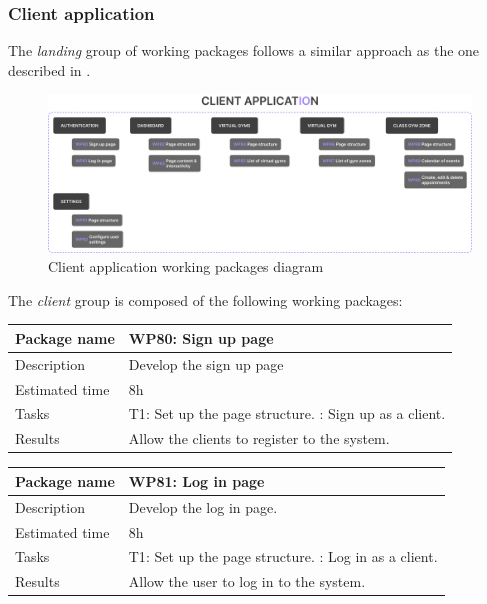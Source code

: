 \documentclass[a4paper, 12pt, oneside]{book}
\begin{document}
\subsubsection{Client application}
The \emph{landing} group of working packages follows a similar approach as the one described in \emph{}.
\begin{figure}[H]
	\centering
	\includegraphics[width=\textwidth]{assets/working-packages/Client.png}
	\caption{Client application working packages diagram}
\end{figure}
The \emph{client} group is composed of the following working packages:
\\[8pt]
\begin{tabularx}{\textwidth}{| l | X |}
	\hline
	\rowcolor{rowColor}
	{\semibf Package name}   & {\semibf WP80}: Sign up page                 \\
	\hline
	{\semibf Description}    & Develop the sign up page                     \\
	\hline
	\rowcolor{rowColor}
	{\semibf Estimated time} & 8h                                           \\
	\hline
	{\semibf Tasks}          & {\semibf T1}: Set up the page structure.
	\newline {\semibf T2}: Sign up as a client.                             \\
	\hline
	\rowcolor{rowColor}
	{\semibf Results}        & Allow the clients to register to the system. \\
	\hline
\end{tabularx}
\vspace*{16pt}
\begin{tabularx}{\textwidth}{| l | X |}
	\hline
	\rowcolor{rowColor}
	{\semibf Package name}   & {\semibf WP81}: Log in page              \\
	\hline
	{\semibf Description}    & Develop the log in page.                 \\
	\hline
	\rowcolor{rowColor}
	{\semibf Estimated time} & 8h                                       \\
	\hline
	{\semibf Tasks}          & {\semibf T1}: Set up the page structure.
	\newline {\semibf T2}: Log in as a client.                          \\
	\hline
	\rowcolor{rowColor}
	{\semibf Results}        & Allow the user to log in to the system.  \\
	\hline
\end{tabularx}
\end{document}
